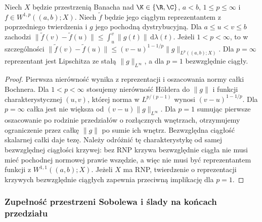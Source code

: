 \begin{wniosek}
\label{cor:sobolev-curve-estimate15b}
Niech $X$ będzie przestrzenią Banacha nad $\K\in\{\R,\C\}$,
$a<b$, $1\le p\le\infty$ i $f\in W^{1,p}((a,b);X)$.
Niech $\widetilde f$ będzie jego ciągłym reprezentantem
z poprzedniego twierdzenia i $g$ jego pochodną dystrybucyjną.
Dla $a\le u<v\le b$ zachodzi
$\|\widetilde f(v)-\widetilde f(u)\|
\le\int_u^v\|g(t)\|\,\mathrm d\lambda(t)$.
Jeżeli $1<p<\infty$, to w szczególności
$\|\widetilde f(v)-\widetilde f(u)\|
\le (v-u)^{1-1/p}\|g\|_{L^p((a,b);X)}$.
Dla $p=\infty$ reprezentant jest Lipschitza ze stałą
$\|g\|_{L^\infty}$, a dla $p=1$ bezwzględnie ciągły.
\end{wniosek}
\begin{proof}
Pierwsza nierówność wynika z reprezentacji i oszacowania
normy całki Bochnera. Dla $1<p<\infty$ stosujemy
nierówność Höldera do $\|g\|$ i funkcji charakterystycznej
$(u,v)$, której norma w $L^{p/(p-1)}$ wynosi
$(v-u)^{1-1/p}$. Dla $p=\infty$ całka jest nie większa
od $(v-u)\|g\|_{L^\infty}$. Dla $p=1$ sumując pierwsze oszacowanie po rodzinie
przedziałów o rozłącznych wnętrzach, otrzymujemy
ograniczenie przez całkę $\|g\|$ po sumie ich wnętrz.
Bezwzględna ciągłość skalarnej całki daje tezę.
Należy odróżnić tę charakterystykę od samej
bezwzględnej ciągłości krzywej: bez RNP krzywa
bezwzględnie ciągła nie musi mieć pochodnej normowej
prawie wszędzie, a więc nie musi być reprezentantem
funkcji z $W^{1,1}((a,b);X)$. Jeżeli $X$ ma RNP,
twierdzenie o reprezentacji krzywych bezwzględnie
ciągłych zapewnia przeciwną implikację dla $p=1$.
\end{proof}

\subsubsection{Zupełność przestrzeni Sobolewa i ślady na końcach przedziału}

